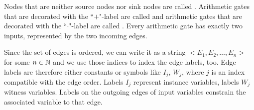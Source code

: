 Nodes that are neither source nodes nor sink nodes are called . Arithmetic gates that are decorated with the ``$+$"-label are called  and arithmetic gates that are decorated with the ``$\cdot$"-label are called . Every arithmetic gate has exactly two inputs, represented by the two incoming edges.

Since the set of edges is ordered, we can write it as a string $<E_1,E_2,\ldots, E_n>$ for some $n\in \mathbb{N}$ and we use those indices to index the edge labels, too. Edge labels are therefore either constants or symbols like $I_j$, $W_j$, where $j$ is an index compatible with the edge order. Labels $I_j$ represent instance variables, labels $W_j$ witness variables. Labels on the outgoing edges of input variables constrain the associated variable to that edge. 

